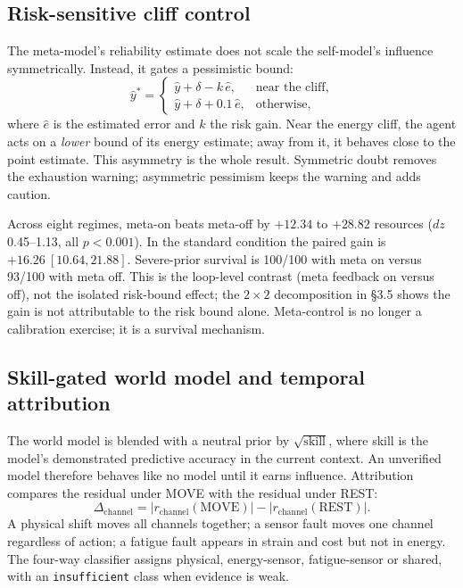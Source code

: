 \documentclass[11pt,a4paper]{article}
\begin{document}
\subsection{Risk-sensitive cliff control}

The meta-model's reliability estimate does not scale the self-model's influence symmetrically. Instead, it gates a pessimistic bound:
\begin{equation}
\hat{y}^{*} =
\begin{cases}
\hat{y} + \delta - k\,\hat{e}, & \text{near the cliff},\\[2pt]
\hat{y} + \delta + 0.1\,\hat{e}, & \text{otherwise},
\end{cases}
\end{equation}
where $\hat{e}$ is the estimated error and $k$ the risk gain. Near the energy cliff, the agent acts on a \emph{lower} bound of its energy estimate; away from it, it behaves close to the point estimate. This asymmetry is the whole result. Symmetric doubt removes the exhaustion warning; asymmetric pessimism keeps the warning and adds caution.

Across eight regimes, meta-on beats meta-off by $\mathbf{+12.34}$ to $\mathbf{+28.82}$ resources ($dz$ 0.45--1.13, all $p<0.001$). In the standard condition the paired gain is $\mathbf{+16.26\ [10.64,21.88]}$. Severe-prior survival is 100/100 with meta on versus 93/100 with meta off. This is the loop-level contrast (meta feedback on versus off), not the isolated risk-bound effect; the $2\times2$ decomposition in \S3.5 shows the gain is not attributable to the risk bound alone. Meta-control is no longer a calibration exercise; it is a survival mechanism.

\subsection{Skill-gated world model and temporal attribution}

The world model is blended with a neutral prior by $\sqrt{\mathrm{skill}}$, where skill is the model's demonstrated predictive accuracy in the current context. An unverified model therefore behaves like no model until it earns influence. Attribution compares the residual under MOVE with the residual under REST:
\begin{equation}
\Delta_{\mathrm{channel}} = \bigl|r_{\mathrm{channel}}(\mathrm{MOVE})\bigr| - \bigl|r_{\mathrm{channel}}(\mathrm{REST})\bigr|.
\end{equation}
A physical shift moves all channels together; a sensor fault moves one channel regardless of action; a fatigue fault appears in strain and cost but not in energy. The four-way classifier assigns physical, energy-sensor, fatigue-sensor or shared, with an \texttt{insufficient} class when evidence is weak.
\end{document}
